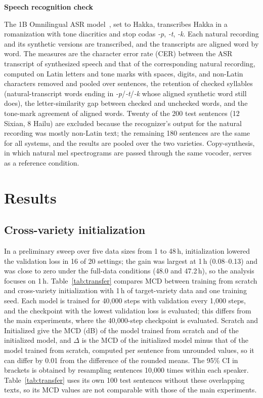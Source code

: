 \documentclass[conference,a4paper]{IEEEtran}
\newcommand{\parhead}[1]{\par\vspace{2pt}\noindent\textbf{#1}\par\nobreak}
\begin{document}
\parhead{Speech recognition check}
The 1B Omnilingual ASR model~\cite{omnilingual2025}, set to Hakka, transcribes Hakka in a romanization with tone diacritics and stop codas \textit{-p}, \textit{-t}, \textit{-k}. Each natural recording and its synthetic versions are transcribed, and the transcripts are aligned word by word. The measures are the character error rate (CER) between the ASR transcript of synthesized speech and that of the corresponding natural recording, computed on Latin letters and tone marks with spaces, digits, and non-Latin characters removed and pooled over sentences, the retention of checked syllables (natural-transcript words ending in \textit{-p}/\textit{-t}/\textit{-k} whose aligned synthetic word still does), the letter-similarity gap between checked and unchecked words, and the tone-mark agreement of aligned words. Twenty of the 200 test sentences (12 Sixian, 8 Hailu) are excluded because the recognizer's output for the natural recording was mostly non-Latin text; the remaining 180 sentences are the same for all systems, and the results are pooled over the two varieties. Copy-synthesis, in which natural mel spectrograms are passed through the same vocoder, serves as a reference condition.

\section{Results}

\subsection{Cross-variety initialization}
In a preliminary sweep over five data sizes from 1 to 48\,h, initialization lowered the validation loss in 16 of 20 settings; the gain was largest at 1\,h (0.08--0.13) and was close to zero under the full-data conditions (48.0 and 47.2\,h), so the analysis focuses on 1\,h. Table~\ref{tab:transfer} compares MCD between training from scratch and cross-variety initialization with 1\,h of target-variety data and one training seed. Each model is trained for 40{,}000 steps with validation every 1{,}000 steps, and the checkpoint with the lowest validation loss is evaluated; this differs from the main experiments, where the 40{,}000-step checkpoint is evaluated. Scratch and Initialized give the MCD (dB) of the model trained from scratch and of the initialized model, and $\Delta$ is the MCD of the initialized model minus that of the model trained from scratch, computed per sentence from unrounded values, so it can differ by 0.01 from the difference of the rounded means. The 95\% CI in brackets is obtained by resampling sentences 10{,}000 times within each speaker. Table~\ref{tab:transfer} uses its own 100 test sentences without these overlapping texts, so its MCD values are not comparable with those of the main experiments.
\end{document}
